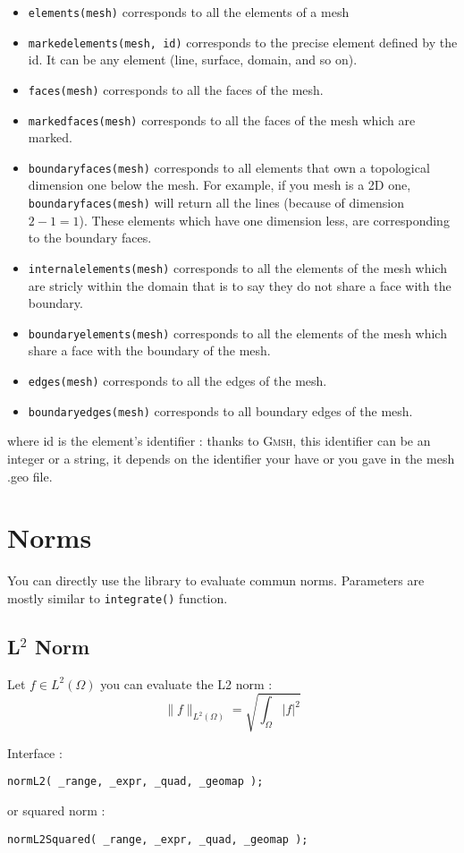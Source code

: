 \begin{itemize}
\item \lstinline!elements(mesh)!  corresponds to all the elements of a mesh
\item \lstinline!markedelements(mesh, id)!  corresponds to the precise element defined by the id. It can be any element (line, surface, domain, and so on).
\item \lstinline!faces(mesh)!  corresponds to all the faces of the mesh.
\item \lstinline!markedfaces(mesh)!  corresponds to all the faces of the mesh which are marked.
\item \lstinline!boundaryfaces(mesh)!  corresponds to all elements that own a topological dimension one below the mesh. For example, if you mesh is a 2D one, \lstinline!boundaryfaces(mesh)! will return all the lines (because of dimension $2-1=1$). These elements which have one dimension less, are corresponding to the boundary faces.
\item \lstinline!internalelements(mesh)!  corresponds to all the elements of the mesh which are stricly within the domain that is to say they do not share a face with the boundary.
\item \lstinline!boundaryelements(mesh)!  corresponds to all the elements of the mesh which share a face with the boundary of the mesh.
\item \lstinline!edges(mesh)!  corresponds to all the edges of the mesh.
\item \lstinline!boundaryedges(mesh)!  corresponds to all boundary edges of the mesh.
\end{itemize}
where id is the element's identifier : thanks to \textsc{Gmsh}, this identifier can be an integer or a string, it depends on the identifier your have or you gave in the mesh .geo file.

\section{Norms}
You can directly use the library to evaluate commun norms. Parameters are mostly similar to \lstinline!integrate()! function.

\subsection{L$^2$ Norm}
Let $f \in L^2(\Omega)$ you can evaluate the L2 norm :
$$\parallel f\parallel_{L^2(\Omega)}=\sqrt{\int_\Omega |f|^2}$$

\label{keywords:normL2}
\noindent Interface :
\begin{lstlisting}
normL2( _range, _expr, _quad, _geomap );
\end{lstlisting}
or squared norm :
\begin{lstlisting}
normL2Squared( _range, _expr, _quad, _geomap );
\end{lstlisting}

